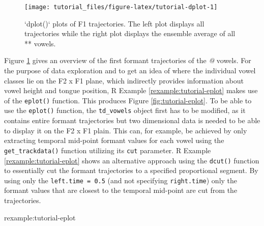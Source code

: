 \documentclass[]{book}
\newenvironment{Shaded}{\begin{snugshade}}{\end{snugshade}}
\newcommand{\CommentTok}[1]{\textcolor[rgb]{0.56,0.35,0.01}{\textit{#1}}}
\newcommand{\DataTypeTok}[1]{\textcolor[rgb]{0.13,0.29,0.53}{#1}}
\newcommand{\DecValTok}[1]{\textcolor[rgb]{0.00,0.00,0.81}{#1}}
\newcommand{\FloatTok}[1]{\textcolor[rgb]{0.00,0.00,0.81}{#1}}
\newcommand{\KeywordTok}[1]{\textcolor[rgb]{0.13,0.29,0.53}{\textbf{#1}}}
\newcommand{\NormalTok}[1]{#1}
\newcommand{\OperatorTok}[1]{\textcolor[rgb]{0.81,0.36,0.00}{\textbf{#1}}}
\newcommand{\OtherTok}[1]{\textcolor[rgb]{0.56,0.35,0.01}{#1}}
\newcommand{\StringTok}[1]{\textcolor[rgb]{0.31,0.60,0.02}{#1}}
\theoremstyle{definition}
\theoremstyle{definition}
\theoremstyle{definition}
\theoremstyle{remark}
\begin{document}
\begin{figure}

{\centering \texttt{[image: tutorial\_files/figure-latex/tutorial-dplot-1]} 

}

\caption{`dplot()` plots of F1 trajectories. The left plot displays all trajectories while the right plot displays the ensemble average of all *\@* vowels.}\label{fig:tutorial-dplot}
\end{figure}

Figure \ref{fig:tutorial-dplot} gives an overview of the first formant
trajectories of the \emph{@} vowels. For the purpose of data exploration
and to get an idea of where the individual vowel classes lie on the F2 x
F1 plane, which indirectly provides information about vowel height and
tongue position, R Example \ref{rexample:tutorial-eplot} makes use of
the \texttt{eplot()} function. This produces Figure
\ref{fig:tutorial-eplot}. To be able to use the \texttt{eplot()}
function, the \texttt{td\_vowels} object first has to be modified, as it
contains entire formant trajectories but two dimensional data is needed
to be able to display it on the F2 x F1 plain. This can, for example, be
achieved by only extracting temporal mid-point formant values for each
vowel using the \texttt{get\_trackdata()} function utilizing its
\texttt{cut} parameter. R Example \ref{rexample:tutorial-eplot} shows an
alternative approach using the \texttt{dcut()} function to essentially
cut the formant trajectories to a specified proportional segment. By
using only the \texttt{left.time\ =\ 0.5} (and not specifying
\texttt{right.time}) only the formant values that are closest to the
temporal mid-point are cut from the trajectories.

rexample:tutorial-eplot

\begin{Shaded}
\end{Shaded}
\end{document}
